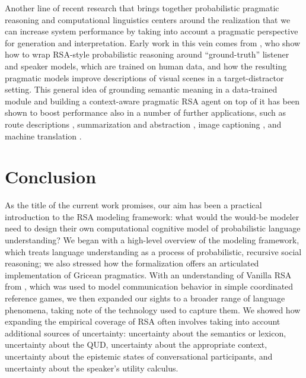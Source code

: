 \documentclass{sp}
\newcommand{\mf}[1]{\textcolor{orange}{[mf: #1]}}
\newcommand{\mht}[1]{\textcolor{purple}{[mht: #1]}}
\begin{document}
Another line of recent research that brings together probabilistic pragmatic reasoning and computational linguistics centers around the realization that we can increase system performance by taking into account a pragmatic perspective for generation and interpretation.
Early work in this vein comes from \citet{AndreasKlein2016:Reasoning-about}, who show how to wrap RSA-style probabilistic reasoning around ``ground-truth'' listener and speaker models, which are trained on human data, and how the resulting pragmatic models improve descriptions of visual scenes in a target-distractor setting.
This general idea of grounding semantic meaning in a data-trained module and building a context-aware pragmatic RSA agent on top of it has been shown to boost performance also in a number of further applications, such as route descriptions \citep{FriedHu2018:Speaker-Followe}, summarization and abstraction \citep{ShenFried2019:Pragmatically-I}, image captioning \citep{Cohn-GordonGoodman2018:Pragmatically-I,NieCohn-Gordon2020:Pragmatic-Issue}, and machine translation \citep{Cohn-GordonGoodman2019:Lost-in-Machine}.



\section{Conclusion} \label{summary}

As the title of the current work promises, our aim has been a practical introduction to the RSA modeling framework: what would the would-be modeler need to design their own computational cognitive model of probabilistic language understanding? We began with a high-level overview of the modeling framework, which treats language understanding as a process of probabilistic, recursive social reasoning; we also stressed how the formalization offers an articulated implementation of Gricean pragmatics. With an understanding of Vanilla RSA from \cite{frankgoodman2012}, which was used to model communication behavior in simple coordinated reference games, we then expanded our sights to a broader range of language phenomena, taking note of the technology used to capture them. We showed how expanding the empirical coverage of RSA often involves taking into account additional sources of uncertainty: uncertainty about the semantics or lexicon, uncertainty about the QUD, uncertainty about the appropriate context, uncertainty about the epistemic states of conversational participants, and uncertainty about the speaker's utility calculus.
\end{document}
